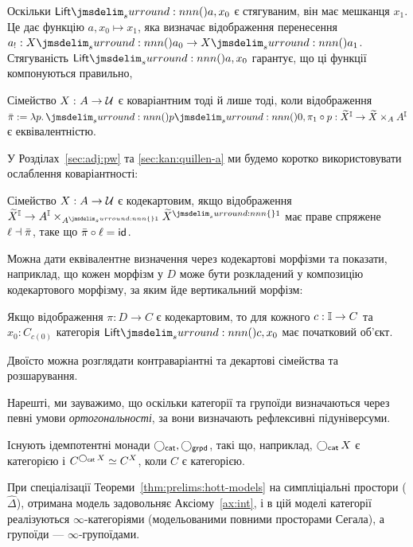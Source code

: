 \documentclass[12pt]{article}
\newcommand{\textcite}{\cite}
\newcommand{\SIMP}{\Delta}
\newcommand{\PSH}[1]{\widehat{#1}}
\newcommand{\Equiv}{\mathrel{\simeq}}
\let\prn\DelimPrn
\let\brc\DelimBrc
\begin{document}
Оскільки $\Con{Lift}\prn{a,x_0}$ є стягуваним, він має мешканця $x_1$. Це дає функцію $a,x_0 \mapsto x_1$, яка визначає відображення перенесення $a_! : X\prn{a_0} \to X\prn{a_1}$. Стягуваність $\Con{Lift}\prn{a,x_0}$ гарантує, що ці функції компонуються правильно, \etc{}

\begin{lem}
  \label{lem:prelims:covariant}
  Сімейство $\DeclVar{X}{}{A \to \UU}$ є коваріантним тоді й лише тоді, коли відображення $\bar{\pi} := \lambda p.\,\prn{p\prn{0}, \Proj[1] \circ p} : \TotalType X^\Int \to \TotalType X \times_A A^\Int$ є еквівалентністю.
\end{lem}

У Розділах~\ref{sec:adj:pw} та \ref{sec:kan:quillen-a} ми будемо коротко використовувати ослаблення коваріантності:
\begin{defi}
  Сімейство $X : A \to \Uni$ є кодекартовим, якщо відображення ${\TotalType{X}}^\Int \to A^\Int \times_{A^{\brc{1}}} {\TotalType{X}}^{\brc{1}}$ має праве спряжене $\ell \dashv \bar{\pi}$, таке що $\bar{\pi} \circ \ell = \ArrId{}$.
\end{defi}
Можна дати еквівалентне визначення через кодекартові морфізми та показати, наприклад, що кожен морфізм у $D$ може бути розкладений у композицію кодекартового морфізму, за яким йде вертикальний морфізм:
\begin{thm}[\textcite{buchholtz:2023}]
  Якщо відображення $\pi : D \to C$ є кодекартовим, то для кожного $c : \mathbb{I} \to C$ та $x_0 : C_{c(0)}$ категорія $\Con{Lift}\prn{c,x_0}$ має початковий об'єкт.
\end{thm}
Двоїсто можна розглядати контраваріантні та декартові сімейства та розшарування.

Нарешті, ми зауважимо, що оскільки категорії та групоїди визначаються через певні умови \emph{ортогональності}, за \textcite{rijke:2020} вони визначають рефлексивні підуніверсуми.
\begin{prop}
  Існують ідемпотентні монади $\operatorname{\bigcirc_{\mathsf{cat}}},\operatorname{\bigcirc_{\mathsf{grpd}}}$, такі що, наприклад, $\operatorname{\bigcirc_{\mathsf{cat}}} X$ є категорією і $C^{\Rezkify X} \Equiv C^X$, коли $C$ є категорією.
\end{prop}

\begin{prop}[\textcite{riehl:2017}]
  \label{thm:prelims:stt-models}
  При спеціалізації Теореми~\ref{thm:prelims:hott-models} на симпліціальні простори \textup($\PSH{\SIMP}$\textup), отримана модель задовольняє Аксіому~\ref{ax:int}, і в цій моделі категорії реалізуються $\infty$-категоріями \textup(модельованими повними просторами Сегала\textup), а групоїди --- $\infty$-групоїдами.
\end{prop}
\end{document}
